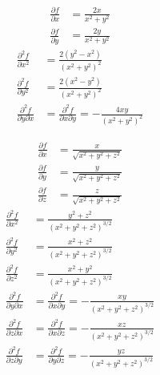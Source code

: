 
\begin{tanswer}
\begin{align*}
    \frac{\partial f}{\partial x} &= \frac{2x}{x^2+y^2} \\
    \frac{\partial f}{\partial y} &= \frac{2y}{x^2+y^2}
\end{align*}
\begin{align*}
    \frac{\partial^2 f}{\partial x^2} &= \frac{2(y^2-x^2)}{(x^2+y^2)^2} \\
    \frac{\partial^2 f}{\partial y^2} &= \frac{2(x^2-y^2)}{(x^2+y^2)^2} \\
    \frac{\partial^2 f}{\partial y \partial x} &= \frac{\partial^2 f}{\partial x \partial y} = -\frac{4xy}{(x^2+y^2)^2}
\end{align*}
\end{tanswer}

\begin{tanswer}
\begin{align*}
    \frac{\partial f}{\partial x} &= \frac{x}{\sqrt{x^2+y^2+z^2}} \\
    \frac{\partial f}{\partial y} &= \frac{y}{\sqrt{x^2+y^2+z^2}} \\
    \frac{\partial f}{\partial z} &= \frac{z}{\sqrt{x^2+y^2+z^2}}
\end{align*}
\begin{align*}
    \frac{\partial^2 f}{\partial x^2} &= \frac{y^2+z^2}{(x^2+y^2+z^2)^{3/2}} \\
    \frac{\partial^2 f}{\partial y^2} &= \frac{x^2+z^2}{(x^2+y^2+z^2)^{3/2}} \\
    \frac{\partial^2 f}{\partial z^2} &= \frac{x^2+y^2}{(x^2+y^2+z^2)^{3/2}} \\
    \frac{\partial^2 f}{\partial y \partial x} &= \frac{\partial^2 f}{\partial x \partial y} = -\frac{xy}{(x^2+y^2+z^2)^{3/2}} \\
    \frac{\partial^2 f}{\partial z \partial x} &= \frac{\partial^2 f}{\partial x \partial z} = -\frac{xz}{(x^2+y^2+z^2)^{3/2}} \\
    \frac{\partial^2 f}{\partial z \partial y} &= \frac{\partial^2 f}{\partial y \partial z} = -\frac{yz}{(x^2+y^2+z^2)^{3/2}}
\end{align*}
\end{tanswer}



